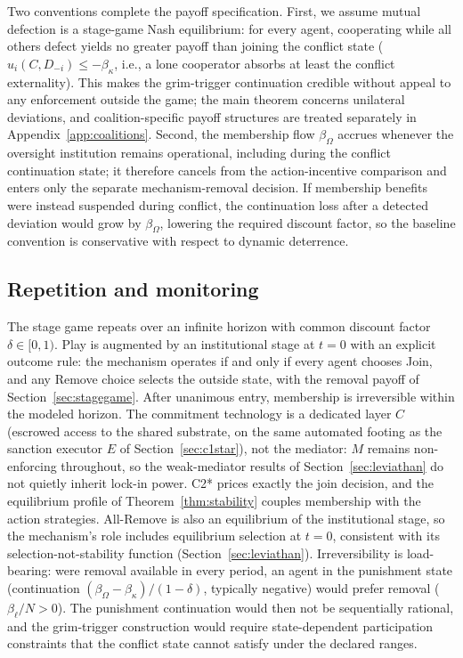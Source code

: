 \documentclass[manuscript,screen,review]{jair}
\begin{document}
Two conventions complete the payoff specification. First, we assume mutual defection is a stage-game Nash equilibrium: for every agent, cooperating while all others defect yields no greater payoff than joining the conflict state ($u_i(C, D_{-i}) \leq -\beta_\kappa$, i.e., a lone cooperator absorbs at least the conflict externality). This makes the grim-trigger continuation credible without appeal to any enforcement outside the game; the main theorem concerns unilateral deviations, and coalition-specific payoff structures are treated separately in Appendix~\ref{app:coalitions}. Second, the membership flow $\beta_\Omega$ accrues whenever the oversight institution remains operational, including during the conflict continuation state; it therefore cancels from the action-incentive comparison and enters only the separate mechanism-removal decision. If membership benefits were instead suspended during conflict, the continuation loss after a detected deviation would grow by $\beta_\Omega$, lowering the required discount factor, so the baseline convention is conservative with respect to dynamic deterrence.

\subsection{Repetition and monitoring}
\label{sec:monitoring-model}

The stage game repeats over an infinite horizon with common discount factor $\delta \in [0,1)$. Play is augmented by an institutional stage at $t = 0$ with an explicit outcome rule: the mechanism operates if and only if every agent chooses Join, and any Remove choice selects the outside state, with the removal payoff of Section~\ref{sec:stagegame}. After unanimous entry, membership is irreversible within the modeled horizon. The commitment technology is a dedicated layer $C$ (escrowed access to the shared substrate, on the same automated footing as the sanction executor $E$ of Section~\ref{sec:c1star}), not the mediator: $M$ remains non-enforcing throughout, so the weak-mediator results of Section~\ref{sec:leviathan} do not quietly inherit lock-in power. C2* prices exactly the join decision, and the equilibrium profile of Theorem~\ref{thm:stability} couples membership with the action strategies. All-Remove is also an equilibrium of the institutional stage, so the mechanism's role includes equilibrium selection at $t = 0$, consistent with its selection-not-stability function (Section~\ref{sec:leviathan}). Irreversibility is load-bearing: were removal available in every period, an agent in the punishment state (continuation $(\beta_\Omega - \beta_\kappa)/(1-\delta)$, typically negative) would prefer removal ($\beta_\ell/N > 0$). The punishment continuation would then not be sequentially rational, and the grim-trigger construction would require state-dependent participation constraints that the conflict state cannot satisfy under the declared ranges.
\end{document}
